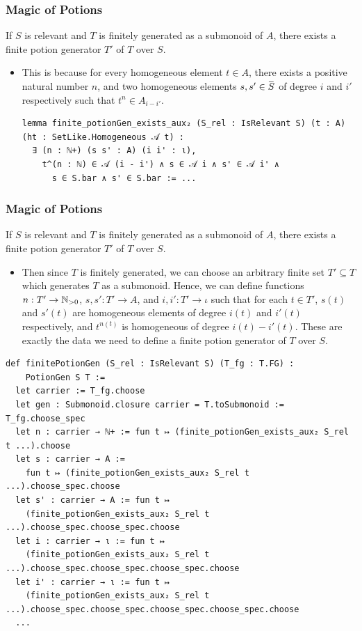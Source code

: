 \documentclass[9pt]{beamer}
\begin{document}
\begin{frame}[fragile]
  \frametitle{Magic of Potions}
\begin{theorem}
  If $S$ is relevant and $T$ is finitely generated as a submonoid of $A$, there exists a finite potion generator $T'$ of $T$ over $S$. 
\end{theorem}
\begin{itemize}
  \item 
  This is because for every homogeneous element $t \in A$, there exists a positive natural number $n$,
  and two homogeneous elements $s, s' \in \mybar{S}$ of degree $i$ and $i'$ respectively such that $t^n \in A_{i - i'}$.
\begin{lstlisting}[]
lemma finite_potionGen_exists_aux₂ (S_rel : IsRelevant S) (t : A) (ht : SetLike.Homogeneous 𝒜 t) :
  ∃ (n : ℕ+) (s s' : A) (i i' : ι),
    t^(n : ℕ) ∈ 𝒜 (i - i') ∧ s ∈ 𝒜 i ∧ s' ∈ 𝒜 i' ∧ 
      s ∈ S.bar ∧ s' ∈ S.bar := ...
\end{lstlisting}
\end{itemize}
\end{frame}

\begin{frame}[fragile]
  \frametitle{Magic of Potions}
\begin{theorem}
  If $S$ is relevant and $T$ is finitely generated as a submonoid of $A$, there exists a finite potion generator $T'$ of $T$ over $S$. 
\end{theorem}
\begin{itemize}
  \item Then since $T$ is finitely generated, we can choose an arbitrary finite set $T' \subseteq T$ which generates $T$ as a submonoid.
  Hence, we can define functions 
  $n : T' \to \mathbb{N}_{>0}$, $s, s' : T' \to A$, and $i, i' : T' \to \iota$ such that for each $t \in T'$,
  $s(t)$ and $s'(t)$ are homogeneous elements of degree $i(t)$ and $i'(t)$ respectively, and $t^{n(t)}$ is homogeneous of degree $i(t) - i'(t)$.
  These are exactly the data we need to define a finite potion generator of $T$ over $S$.
\end{itemize}
  \begin{lstlisting}[extendedchars=true, basicstyle=\ttfamily\footnotesize]
def finitePotionGen (S_rel : IsRelevant S) (T_fg : T.FG) : 
    PotionGen S T :=
  let carrier := T_fg.choose
  let gen : Submonoid.closure carrier = T.toSubmonoid := T_fg.choose_spec
  let n : carrier → ℕ+ := fun t ↦ (finite_potionGen_exists_aux₂ S_rel t ...).choose
  let s : carrier → A :=
    fun t ↦ (finite_potionGen_exists_aux₂ S_rel t ...).choose_spec.choose
  let s' : carrier → A := fun t ↦
    (finite_potionGen_exists_aux₂ S_rel t ...).choose_spec.choose_spec.choose
  let i : carrier → ι := fun t ↦
    (finite_potionGen_exists_aux₂ S_rel t ...).choose_spec.choose_spec.choose_spec.choose
  let i' : carrier → ι := fun t ↦
    (finite_potionGen_exists_aux₂ S_rel t ...).choose_spec.choose_spec.choose_spec.choose_spec.choose
  ...
  \end{lstlisting}
\end{frame}
\end{document}
